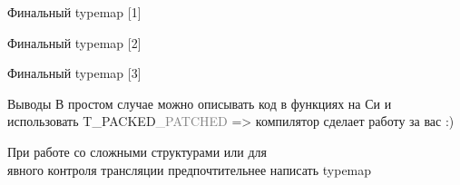\begin{frame}[fragile]{Финальный typemap [1]}
\end{frame}

\begin{frame}[fragile]{Финальный typemap [2]}
\end{frame}

\begin{frame}[fragile]{Финальный typemap [3]}

\end{frame}

\begin{frame}[fragile]{Выводы}
    В простом случае можно описывать код в функциях на Си и использовать T\_PACKED\textcolor{gray}{\_PATCHED}
    => компилятор сделает работу за вас :)
    \vspace{0.5cm}

    При работе со сложными структурами или для\\
    явного контроля трансляции предпочтительнее написать typemap
\end{frame}

\finalframe

